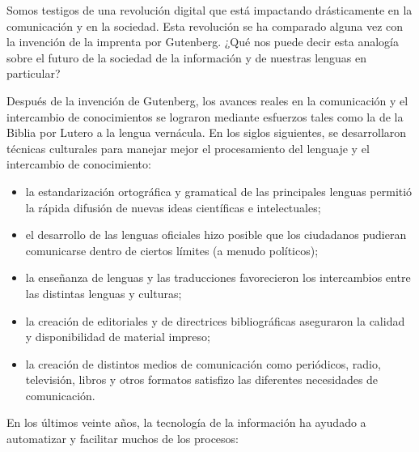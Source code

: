 \begin{multicols}{2}
  Somos testigos de una revolución digital que está impactando drásticamente en la comunicación y en la sociedad. Esta revolución se ha comparado alguna vez con la invención de la imprenta por Gutenberg. ¿Qué nos puede decir esta analogía sobre el futuro de la sociedad de la información y de nuestras lenguas en particular?


Después de la invención de Gutenberg, los avances reales en la comunicación y el intercambio de conocimientos se lograron mediante esfuerzos tales como la de la Biblia por Lutero a la lengua vernácula. En los siglos siguientes, se desarrollaron técnicas culturales para manejar mejor el procesamiento del lenguaje y el intercambio de conocimiento:

\medskip
\begin{itemize}
  \item la estandarización ortográfica y gramatical de las principales lenguas permitió la rápida difusión de nuevas ideas científicas e intelectuales; 
  \item	el desarrollo de las lenguas oficiales hizo posible que los ciudadanos pudieran comunicarse dentro de ciertos límites (a menudo políticos);
  \item	la enseñanza de lenguas y las traducciones favorecieron los  intercambios entre las distintas lenguas y culturas;
  \item	la creación de editoriales y de directrices bibliográficas aseguraron la calidad y disponibilidad de material impreso;
  \item	la creación de distintos medios de comunicación como periódicos, radio, televisión, libros y otros formatos satisfizo las diferentes necesidades de comunicación. 

\end{itemize}

  En los últimos veinte años, la tecnología de la información ha ayudado a automatizar y facilitar muchos de los procesos:


\end{multicols}
